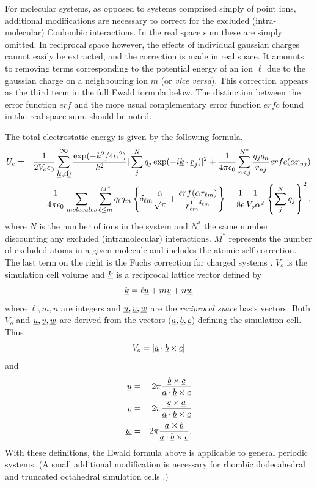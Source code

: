 For molecular systems, as opposed to systems comprised simply of point
ions, additional modifications are necessary to correct for the
excluded (intra-molecular) Coulombic interactions.  In the real space
sum these are simply omitted. In reciprocal space however, the effects
of individual gaussian charges cannot easily be extracted, and the
correction is made in real space.  It amounts to removing terms
corresponding to the potential energy of an ion $\ell$ due to the
gaussian charge on a neighbouring ion $m$ (or {\em vice versa}).
This correction appears as the third term in the full Ewald formula
below.  The distinction between the error function $erf$ and the more
usual complementary error function $erfc$ found in the real space sum,
should be noted.

The total electrostatic energy is given by the following formula.
\begin{eqnarray}
U_{c}&=&\frac{1}{2V_{o}\epsilon_{0}}
 \sum_{\mbox{$\underline{k}$}\neq\mbox{$\underline{0}$}}^{\mbox{$\underline{\infty}$}}
\frac{\exp(-k^{2}/4\alpha^{2})}{k^{2}}
|\sum_{j}^{N}q_{j}\exp(-i\mbox{$\underline{k}$}\cdot\mbox{$\underline{r}$}_{j})|^{2}+
\frac{1}{4\pi\epsilon_{0}}\sum_{n<j}^{N^{*}}\frac{q_{j}q_{n}}{r_{nj}}
erfc(\alpha r_{nj}) \nonumber\\
& &-\frac{1}{4\pi\epsilon_{0}}
\sum_{molecules}\sum_{\ell\le m}^{M^{*}}q_{\ell}q_{m}\left\{\delta_{\ell m}
\frac{\alpha}{\surd \pi}+\frac{erf(\alpha r_{\ell m})}{r_{\ell
m}^{1-\delta_{\ell m}}}\right \}
-\frac{1}{8\epsilon}\frac{1}{V_{o}\alpha^{2}} \left
    \{\sum_{j}^{N}q_{j}\right \}^{2},
\end{eqnarray}
where $N$ is the number of ions in the system and $N^{*}$ the same
number discounting any excluded (intramolecular) interactions.
$M^{*}$ represents the number of excluded atoms in a given molecule
and includes the atomic self correction. The last term on the right is the
Fuchs correction for charged systems \cite{fuchs-35a}.
$V_{o}$ is the simulation cell volume and $\mbox{$\underline{k}$}$ is a reciprocal
lattice vector defined by
\begin{equation}
\mbox{$\underline{k}$}=\ell \mbox{$\underline{u}$} + m \mbox{$\underline{v}$} + n \mbox{$\underline{w}$} \label{k-vector}
\end{equation}
where $\ell,m,n$ are integers and $\mbox{$\underline{u}$},\mbox{$\underline{v}$},\mbox{$\underline{w}$}$ are the
{\em reciprocal space} basis vectors.  Both $V_{o}$ and
$\mbox{$\underline{u}$},\mbox{$\underline{v}$},\mbox{$\underline{w}$}$ are derived from the vectors
($\mbox{$\underline{a}$},\mbox{$\underline{b}$},\mbox{$\underline{c}$}$) defining the simulation cell. Thus
\begin{equation}
V_{o}=|\mbox{$\underline{a}$}\cdot\mbox{$\underline{b}$}\times\mbox{$\underline{c}$}|
\end{equation}
and
\begin{eqnarray}
\mbox{$\underline{u}$}&=&2\pi\frac{\mbox{$\underline{b}$}\times
\mbox{$\underline{c}$}}{\mbox{$\underline{a}$}\cdot\mbox{$\underline{b}$}\times\mbox{$\underline{c}$}}
\nonumber \\
\mbox{$\underline{v}$}&=&2\pi\frac{\mbox{$\underline{c}$}\times \mbox{$\underline{a}$}}{\mbox{$\underline{a}$}\cdot\mbox{$\underline{b}$}\times\mbox{$\underline{c}$}}\\
\mbox{$\underline{w}$}&=&2\pi\frac{\mbox{$\underline{a}$}\times
\mbox{$\underline{b}$}}{\mbox{$\underline{a}$}\cdot\mbox{$\underline{b}$}\times\mbox{$\underline{c}$}}.
\nonumber 
\end{eqnarray}
With these definitions, the Ewald formula above is applicable to
general periodic systems. (A small additional modification is necessary
for rhombic dodecahedral and truncated octahedral simulation cells
\cite{smith-93b}.)

